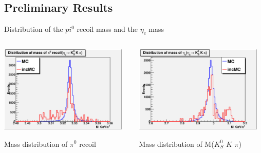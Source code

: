 \documentclass{beamer}
\begin{document}
\subsection{Preliminary Results}
\begin{frame}{Distribution of the $pi^0$ recoil mass and the $\eta_c$ mass }
\vskip -0.51cm
\begin{columns}
\begin{column}{0.45\textwidth}
\begin{center}
\includegraphics[width=0.95\textwidth,angle=0]{figures/kskp_results/Pi0hc_invariant_mass_of_hc.eps}\\
\begin{block}{}
Mass distribution of $\pi^0$ recoil
\end{block}
\end{center}
\end{column}
\begin{column}{0.45\textwidth}
\begin{center}
\includegraphics[width=0.95\textwidth,angle=0]{figures/kskp_results/Pi0hc_invariant_mass_of_etac.eps}\\
\begin{block}{}
Mass distribution of M($K^0_S$ $K$ $\pi$)
\end{block}
\end{center}
\end{column}
\end{columns}
\end{frame}
\end{document}
